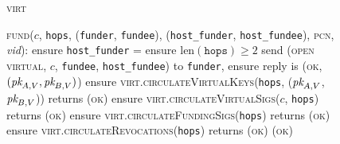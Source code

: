 \begin{figure}[H]
  \begin{processbox}{\textsc{virt}}
    \begin{algorithmic}[1]
      \State \textsc{fund}($c$, \texttt{hops}, (\texttt{funder},
      \texttt{fundee}), (\texttt{host\_funder}, \texttt{host\_fundee}),
      \textsc{pcn}, \textit{vid}):
      \Indent
        \State ensure \texttt{host\_funder} = \alice{} 
        \State ensure $\mathrm{len}(\texttt{hops}) \geq 2$ 
        \State send (\textsc{open virtual}, $c$, \texttt{fundee},
        \texttt{host\_fundee}) to \texttt{funder}, ensure reply is (\textsc{ok},
        $(\textit{pk}_{A, V}, \textit{pk}_{B, V})$)
        \State ensure \textsc{virt.circulateVirtualKeys}(\texttt{hops}, ($\textit{pk}_{A,
        V}$, $\textit{pk}_{B, V}$)) returns (\textsc{ok})
        \State ensure \textsc{virt.circulateVirtualSigs}($c$, \texttt{hops})
        returns (\textsc{ok})
        \State ensure \textsc{virt.circulateFundingSigs}(\texttt{hops}) returns
        (\textsc{ok})
        \State ensure \textsc{virt.circulateRevocations}(\texttt{hops}) returns
        (\textsc{ok})
        \State \Return (\textsc{ok})
      \EndIndent
      \Statex


\end{algorithmic}
\end{processbox}
\end{figure}
